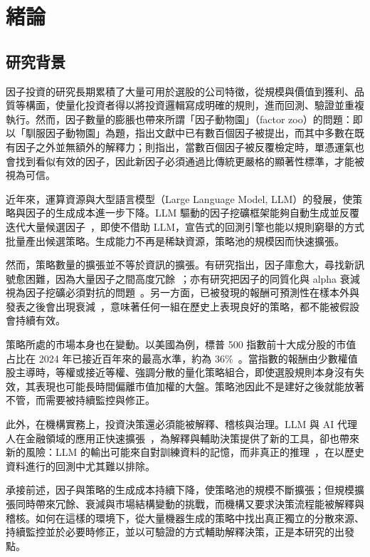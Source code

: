 \chapter{緒論}\label{ch:intro}

\section{研究背景}\label{sec:background}

因子投資的研究長期累積了大量可用於選股的公司特徵，從規模與價值\parencite{famafrench1993}到獲利、品質等構面，使量化投資者得以將投資邏輯寫成明確的規則，進而回測、驗證並重複執行。然而，因子數量的膨脹也帶來所謂「因子動物園」（factor zoo）的問題：\textcite{fenggiglioxiu2020}即以「馴服因子動物園」為題，指出文獻中已有數百個因子被提出，而其中多數在既有因子之外並無額外的解釋力；\textcite{harveyliuzhu2016}則指出，當數百個因子被反覆檢定時，單憑運氣也會找到看似有效的因子，因此新因子必須通過比傳統更嚴格的顯著性標準，才能被視為可信。

近年來，運算資源與大型語言模型（Large Language Model, LLM）的發展，使策略與因子的生成成本進一步下降。LLM 驅動的因子挖礦框架能夠自動生成並反覆迭代大量候選因子~\parencite{tang2025alphaagent, wang2026factorminer}，即使不借助 LLM，宣告式的回測引擎也能以規則窮舉的方式批量產出候選策略。生成能力不再是稀缺資源，策略池的規模因而快速擴張。

然而，策略數量的擴張並不等於資訊的擴張。有研究指出，因子庫愈大，尋找新訊號愈困難，因為大量因子之間高度冗餘~\parencite{wang2026factorminer}；亦有研究把因子的同質化與 alpha 衰減視為因子挖礦必須對抗的問題~\parencite{tang2025alphaagent}。另一方面，已被發現的報酬可預測性在樣本外與發表之後會出現衰減~\parencite{mcleanpontiff2016}，意味著任何一組在歷史上表現良好的策略，都不能被假設會持續有效。

策略所處的市場本身也在變動。以美國為例，標普 500 指數前十大成分股的市值占比在 2024 年已接近百年來的最高水準，約為 36\%~\parencite{goldman2024concentration}。當指數的報酬由少數權值股主導時，等權或接近等權、強調分散的量化策略組合，即使選股規則本身沒有失效，其表現也可能長時間偏離市值加權的大盤。策略池因此不是建好之後就能放著不管，而需要被持續監控與修正。

此外，在機構實務上，投資決策還必須能被解釋、稽核與治理。LLM 與 AI 代理人在金融領域的應用正快速擴張~\parencite{aldridge2026agentic}，為解釋與輔助決策提供了新的工具，卻也帶來新的風險：LLM 的輸出可能來自對訓練資料的記憶，而非真正的推理~\parencite{jeonlee2026blindfolded}，在以歷史資料進行的回測中尤其難以排除。

承接前述，因子與策略的生成成本持續下降，使策略池的規模不斷擴張；但規模擴張同時帶來冗餘、衰減與市場結構變動的挑戰，而機構又要求決策流程能被解釋與稽核。如何在這樣的環境下，從大量機器生成的策略中找出真正獨立的分散來源、持續監控並於必要時修正，並以可驗證的方式輔助解釋決策，正是本研究的出發點。


